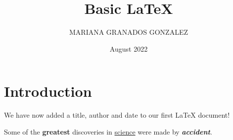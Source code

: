 \documentclass{article} %
\title{Basic LaTeX}
\author{MARIANA GRANADOS GONZALEZ}
\date{August 2022}
\begin{document}
\maketitle

\section{Introduction}
We have now added a title, author and date to our first \LaTeX{} document!

Some of the \textbf{greatest} discoveries in \underline{science}
were made by \textbf{\textit{accident}}.
\end{document}
